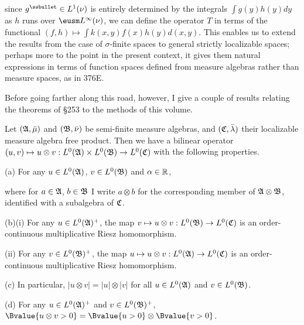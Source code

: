 {\noindent since $g^{\ssbullet}\in L^1(\nu)$ is entirely determined by
the integrals $\int g(y)h(y)dy$ as $h$ runs over $\eusm
L^{\infty}(\nu)$, we can define the operator $T$ in terms of the
functional $(f,h)\mapsto\int k(x,y)f(x)h(y)d(x,y)$.   This enables us to
extend the results from the case of $\sigma$-finite spaces to general
strictly localizable spaces;  perhaps more to the point in the present
context, it gives them natural expressions in terms of function spaces
defined from measure algebras rather than measure spaces, as in 376E.

Before going farther along this road, however, I give a couple of
results relating the theorems of \S253 to the methods of this volume.
}%

Let $(\frak A,\bar\mu)$ and $(\frak B,\bar\nu)$ be semi-finite measure
algebras, and $(\frak C,\bar\lambda)$ their localizable measure algebra
free product.   Then we have a bilinear operator
$(u,v)\mapsto u\otimes v:
L^0(\frak A)\times L^0(\frak B)\to L^0(\frak C)$ with the following
properties.

(a) For any $u\in L^0(\frak A)$, $v\in L^0(\frak B)$ and $\alpha\in\Bbb R$,


\noindent where for $a\in\frak A$, $b\in\frak B$ I write $a\otimes b$
for the corresponding member of
$\frak A\otimes\frak B$, identified with a subalgebra
of $\frak C$.

(b)(i) For any $u\in L^0(\frak A)^+$, the map
$v\mapsto u\otimes v:L^0(\frak B)\to L^0(\frak C)$ is an
order-continuous multiplicative Riesz homomorphism.

\quad (ii) For any $v\in L^0(\frak B)^+$, the map
$u\mapsto u\otimes v:L^0(\frak A)\to L^0(\frak C)$ is an
order-continuous multiplicative Riesz homomorphism.

(c) In particular, $|u\otimes v|=|u|\otimes|v|$ for all
$u\in L^0(\frak A)$ and $v\in L^0(\frak B)$.

(d) For any $u\in L^0(\frak A)^+$ and $v\in L^0(\frak B)^+$,
$\Bvalue{u\otimes v>0}=\Bvalue{u>0}\otimes\Bvalue{v>0}$.

